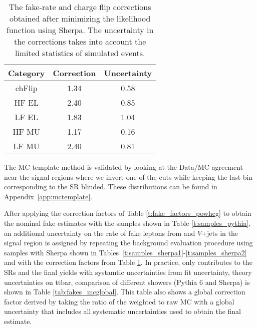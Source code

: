 \begin{table}[htb]
  \caption{The fake-rate and charge flip corrections obtained after minimizing the likelihood function using Sherpa.
    The uncertainty in the corrections takes into account the limited statistics of simulated events.
    \label{t:fake_factors_sherpa}}
  \centering
  \begin{tabular}{|c|c|c|}
    \hline
    Category & Correction & Uncertainty  \\
    \hline
    chFlip & 1.34 & 0.58 \\ 
    HF EL & 2.40 & 0.85 \\
    LF EL & 1.83 & 1.04 \\
    HF MU & 1.17 & 0.16 \\
    LF MU & 2.40 & 0.81 \\
    \hline
  \end{tabular}                                                                                         
\end{table}


The MC template method is validated by looking at the Data/MC agreement near the signal regions where we invert one of the cuts while keeping the last bin corresponding to the SR blinded. These distributions can be found in Appendix~\ref{app:mctemplate}.

After applying the correction factors of Table \ref{t:fake_factors_powheg} to obtain the nominal fake estimates with the samples shown 
in Table \ref{t:samples_pythia}, 
an additional uncertainty on the rate of fake leptons from \ttbar and $V$+jets in the signal region is assigned by repeating the background evaluation 
procedure using samples with Sherpa shown in Tables~\ref{t:samples_sherpa1}-\ref{t:samples_sherpa2} and with the correction factors from 
Table \ref{t:fake_factors_sherpa}. 
In practice, only \ttbar contributes to the SRs and the final yields with systamtic uncertainties from 
fit uncertainty, theory uncertainties on ttbar, comparison of different showers (Pythia 6 and Sherpa) is shown in Table \ref{tab:fakes_mcglobal}.
This table also shows a global correction factor derived by taking the ratio of the weighted \ttbar to raw MC \ttbar with
a global uncertainty that includes all systematic uncertainties used to obtain the final estimate. 


